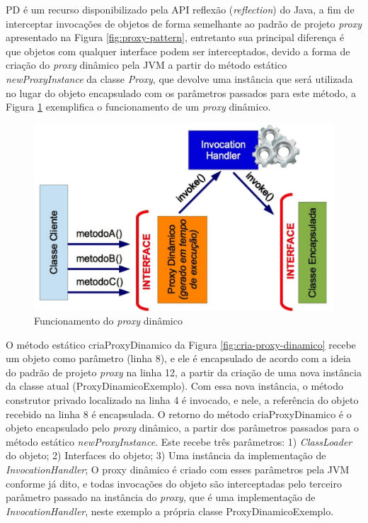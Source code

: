 \par PD é um recurso disponibilizado pela API reflexão (\textit{reflection}) do Java, a fim de interceptar invocações de objetos de forma semelhante ao padrão de projeto \textit{proxy} apresentado na Figura \ref{fig:proxy-pattern}, entretanto sua principal diferença é que objetos com qualquer interface podem ser interceptados, devido a forma de criação do \textit{proxy} dinâmico pela JVM a partir do método estático \textit{newProxyInstance} da classe \textit{Proxy}, que devolve uma instância que será utilizada no lugar do objeto encapsulado com os parâmetros passados para este método, a Figura \ref{fig:proxy-dinamico} exemplifica o funcionamento de um \textit{proxy} dinâmico. 

\begin{figure}[H]
    \centering
    \includegraphics[scale=0.3]{src/imagens/cap2/funcionamento-proxy-dinamico.png}
    \caption{Funcionamento do \textit{proxy} dinâmico}
    \label{fig:proxy-dinamico}
\end{figure}

\par O método estático criaProxyDinamico da Figura \ref{fig:cria-proxy-dinamico} recebe um objeto como parâmetro (linha 8), e ele é encapsulado de acordo com a ideia do padrão de projeto \textit{proxy} na linha 12, a partir da criação de uma nova instância da classe atual (ProxyDinamicoExemplo). Com essa nova instância, o método construtor privado localizado na linha 4 é invocado, e nele, a referência do objeto recebido na linha 8 é encapsulada. O retorno do método criaProxyDinamico é o objeto encapsulado pelo \textit{proxy} dinâmico, a partir dos parâmetros passados para o método estático \textit{newProxyInstance}. Este recebe três parâmetros: 1) \textit{ClassLoader} do objeto; 2) Interfaces do objeto; 3) Uma instância da implementação de \textit{InvocationHandler}; O proxy dinâmico é criado com esses parâmetros pela JVM conforme já dito, e todas invocações do objeto são interceptadas pelo terceiro parâmetro passado na instância do \textit{proxy}, que é uma implementação de \textit{InvocationHandler}, neste exemplo a própria classe ProxyDinamicoExemplo.


